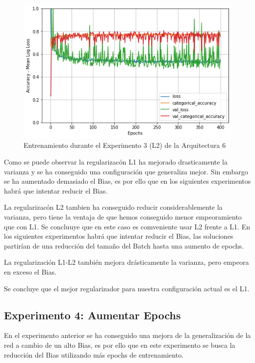 \documentclass{article}
\begin{document}
   \begin{figure}[!h]
				\begin{center}
					\includegraphics[scale=0.5]{tr-a6-e3.1.png}		
					\caption{Entrenamiento durante el Experimento 3 (L2) de la Arquitectura 6}	
					\label{tab:tr-a6-e2}
				\end{center}
			\end{figure}
    Como se puede observar la regularizac\'on L1 ha mejorado drasticamente la varianza y se ha conseguido una configuraci\'on que generaliza mejor. Sin embargo se ha aumentado demasiado el Bias, es por ello que en los siguientes experimentos habr\'a que intentar reducir el Bias. 
    
           La regularizac\'on L2 tambien ha conseguido reducir considerablemente la varianza, pero tiene la ventaja de que hemos conseguido menor empeoramiento que con L1. Se concluuye que en este caso es comveniente usar L2 frente a L1. En los siguientes experimentos habr\'a que intentar reducir el Bias, las soluciones partir\'ian de una reducci\'on del tama\~{n}o del Batch hasta una aumento de epochs. 
           
  La regularizaci\'on L1-L2 tambi\'en mejora dr\'asticamente la varianza, pero empeora en exceso el Bias. 

  Se concluye que el mejor regularizador para nuestra configuraci\'on actual es el L1. 
  
   

   
        \subsection{Experimento 4: Aumentar Epochs}
        En el experimento anterior se ha conseguido una mejora de la generalizaci\'on de la red a cambio de un alto Bias, es por ello que en este experimento se busca la reducci\'on del Bias utilizando m\'as epochs de entrenamiento. 
        
\end{document}
